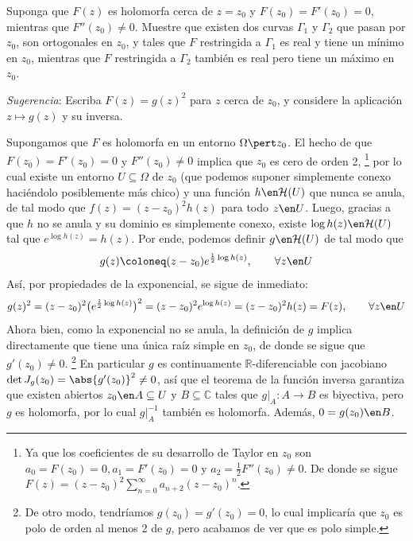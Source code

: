 \setcounter{eje}{1}
\begin{ejer}
Suponga que $F(z)$ es holomorfa cerca de $z=z_0$ y $F(z_0) = F'(z_0) = 0$, mientras que $F''(z_0) \neq 0$. Muestre que existen dos curvas $\Gamma_1$ y $\Gamma_2$ que pasan por $z_0$, son ortogonales en $z_0$, y tales que $F$ restringida a $\Gamma_1$ es real y tiene un mínimo en $z_0$, mientras que $F$ restringida a $\Gamma_2$ también es real pero tiene un máximo en $z_0$.\par
\emph{Sugerencia}: Escriba $F(z) = g(z)^2$ para $z$ cerca de $z_0$, y considere la aplicación $z \mapsto g(z)$ y su inversa.
\end{ejer}
\begin{sol}
Supongamos que $F$ es holomorfa en un entorno $\Omega \pert z_0$. El hecho de que $F(z_0) = F'(z_0) = 0$ y $F''(z_0) \neq 0$ implica que $z_0$ es cero de orden 2,%
\footnote{
    Ya que los coeficientes de su desarrollo de Taylor en $z_0$ son $a_0 = F(z_0) =0, a_1=F'(z_0)=0$ y $a_2 = \frac12F''(z_0)\neq0$. De donde se sigue $F(z) = (z-z_0)^2\sum^\infty_{n=0}a_{n+2}(z-z_0)^n$.
}
por lo cual existe un entorno $U\subseteq \Omega$ de $z_0$ (que podemos suponer simplemente conexo haciéndolo posiblemente más chico) y una función $h \en \mathcal{H}(U)$ que nunca se anula, de tal modo que $f(z) = (z-z_0)^2h(z)$ para todo $z\en U$. Luego, gracias a que $h$ no se anula y su dominio es simplemente conexo, existe $\log h(z) \en \mathcal{H}(U)$ tal que $e^{\log h(z)} = h(z)$. Por ende, podemos definir $g \en \mathcal{H}(U)$ de tal modo que
\[
g(z) \coloneq (z-z_0)e^{\frac12\log h(z)},
\qquad\forall z\en U
\]
Así, por propiedades de la exponencial, se sigue de inmediato:
\[
g(z)^2 
= (z-z_0)^2\bigl(e^{\frac12\log h(z)}\bigr)^2
=(z-z_0)^2e^{\log h(z)}
=(z-z_0)^2h(z) = F(z),
\qquad \forall z \en U
\]
Ahora bien, como la exponencial no se anula, la definición de $g$ implica directamente que tiene una única raíz simple en $z_0$, de donde se sigue que $g'(z_0) \neq 0$.%
\footnote{
    De otro modo, tendríamos $g(z_0)=g'(z_0)=0$, lo cual implicaría que $z_0$ es polo de orden al menos 2 de $g$, pero acabamos de ver que es polo simple.
}
En particular $g$ es continuamente $\mathbb{R}$-diferenciable con jacobiano $\det J_g(z_0) = \abs{g'(z_0)}^2 \neq 0$, así que el teorema de la función inversa garantiza que existen abiertos $z_0 \en A\subseteq U$ y $B\subseteq \mathbb{C}$ tales que $g|_A \colon A \to B$ es biyectiva, pero $g$ es holomorfa, por lo cual $g|_A^{-1}$ también es holomorfa. Además, $0=g(z_0)\en B$. \par

\end{sol}
